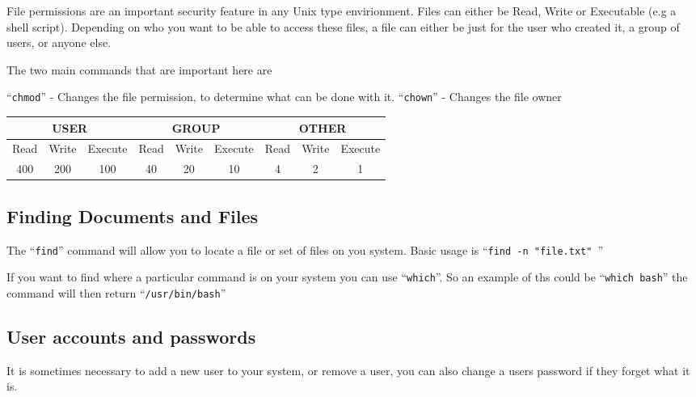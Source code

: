 \documentclass{extbook}
\begin{document}
File permissions are an important security feature in any Unix type envirionment.  Files can either be Read, Write or Executable (e.g a shell script).  Depending on who you want to be able to access these files,  a file can either be just for the user who created it, a group of users, or anyone else.  

The two main commands that are important here are

``\verb|chmod|'' - Changes the file permission, to determine what can be done with it. 
``\verb|chown|'' - Changes the file owner

\begin{table}[h]
\begin{tabular}{|ccc|ccc|ccc|}
\hline
\multicolumn{3}{|c|}{\textbf{USER}}                               & \multicolumn{3}{c|}{\textbf{GROUP}}                              & \multicolumn{3}{c|}{\textbf{OTHER}}                              \\ \hline
\multicolumn{1}{|c|}{Read} & \multicolumn{1}{c|}{Write} & Execute & \multicolumn{1}{c|}{Read} & \multicolumn{1}{c|}{Write} & Execute & \multicolumn{1}{c|}{Read} & \multicolumn{1}{c|}{Write} & Execute \\ \hline
\multicolumn{1}{|c|}{400}  & \multicolumn{1}{c|}{200}   & 100     & \multicolumn{1}{c|}{40}   & \multicolumn{1}{c|}{20}    & 10      & \multicolumn{1}{c|}{4}    & \multicolumn{1}{c|}{2}     & 1       \\ \hline
\end{tabular}
\end{table}


\subsection{Finding Documents and Files}

The ``\verb|find|'' command will allow you to locate a file or set of files on you system.  Basic usage is ``\verb|find -n "file.txt" |''

If you want to find where a particular command is on your system you can use ``\verb|which|''.  So an example of ths could be ``\verb|which bash|'' the command will then return ``\verb|/usr/bin/bash|''

\subsection{User accounts and passwords}

It is sometimes necessary to add a new user to your system, or remove a user, you can also change a users password if they forget what it is.
\end{document}
